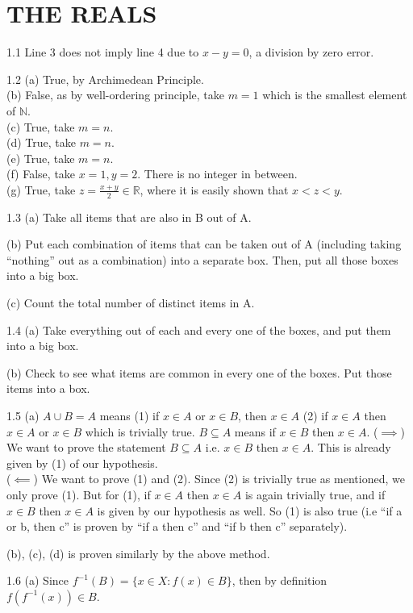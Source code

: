 \section{THE REALS}
1.1 Line 3 does not imply line 4 due to $x-y=0$, a division by zero error.

1.2 (a) True, by Archimedean Principle. 
\\(b) False, as by well-ordering principle, take $m=1$ which is the smallest element of $\mathbb{N}$. 
\\(c) True, take $m=n$.
\\(d) True, take $m=n$.
\\(e) True, take $m=n$.
\\(f) False, take $x=1, y=2$. There is no integer in between.
\\(g) True, take $z=\frac{x+y}{2} \in \mathbb{R}$, where it is easily shown that $x<z<y$.

1.3 (a) Take all items that are also in B out of A.

(b) Put each combination of items that can be taken out of A (including taking ``nothing'' out as a combination) into a separate box. Then, put all those boxes into a big box.

(c) Count the total number of distinct items in A.

1.4 (a) Take everything out of each and every one of the boxes, and put them into a big box.

(b) Check to see what items are common in every one of the boxes. Put those items into a box.

1.5 (a) $A \cup B = A$ means (1) if $x \in A$ or $x \in B$, then $x \in A$ (2) if $x \in A$ then $x \in A$ or $x \in B$ which is trivially true. $B \subseteq A$ means if $x\in B$ then $x \in A$.
($\implies$) We want to prove the statement $B \subseteq A$ i.e. $x\in B$ then $x \in A$. This is already given by (1) of our hypothesis.\\
($\impliedby$) We want to prove (1) and (2). Since (2) is trivially true as mentioned, we only prove (1). But for (1), if $x \in A$ then $x \in A$ is again trivially true, and if $x \in B$ then $x \in A$ is given by our hypothesis as well.
So (1) is also true (i.e ``if a or b, then c'' is proven by ``if a then c'' and ``if b then c'' separately).

(b), (c), (d) is proven similarly by the above method.

1.6 (a) Since $f^{-1}(B)=\{x \in X : f(x) \in B\}$, then by definition $f(f^{-1}(x)) \in B$. 

